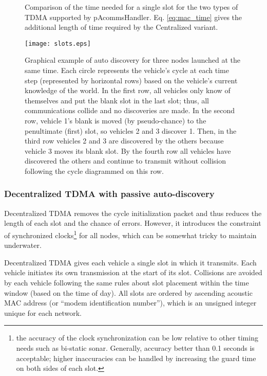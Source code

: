 \begin{figure}
	\centering
\centerline{\hfil
	}
\caption{Comparison of the time needed for a single slot for the two types of TDMA supported by pAcommsHandler. Eq. \ref{eq:mac_time} gives the additional length of time required by the Centralized variant.}
\label{fig:slots}
\end{figure}

\begin{figure}
\centering
\texttt{[image: slots.eps]}
\caption{Graphical example of auto discovery for three nodes launched at the same time. Each circle represents the vehicle's cycle at each time step (represented by horizontal rows) based on the vehicle's current knowledge of the world. In the first row, all vehicles only know of themselves and put the blank slot in the last slot; thus, all communications collide and no discoveries are made. In the second row, vehicle 1's blank is moved (by pseudo-chance) to the penultimate (first) slot, so vehicles 2 and 3 discover 1. Then, in the third row vehicles 2 and 3 are discovered by the others because vehicle 3 moves its blank slot. By the fourth row all vehicles have discovered the others and continue to transmit without collision following the cycle diagrammed on this row.} 
\label{fig:decentralized_cycles}
\end{figure}

\subsubsection{Decentralized TDMA with passive auto-discovery}

Decentralized TDMA removes the cycle initialization packet and thus reduces the length of each slot and the chance of errors. However, it introduces the constraint of synchronized clocks\footnote{the accuracy of the clock synchronization can be  low relative to other timing needs such as bi-static sonar. Generally, accuracy better than 0.1 seconds is acceptable; higher inaccuracies can be handled by increasing the guard time on both sides of each slot.} for all nodes, which can be somewhat tricky to maintain underwater.

Decentralized TDMA gives each vehicle a single slot in which it transmits. Each vehicle initiates its own transmission at the start of its slot. Collisions are avoided by each vehicle following the same rules about slot placement within the time window (based on the time of day). All slots are ordered by ascending acoustic MAC address (or ``modem identification number''), which is an unsigned integer unique for each network.


